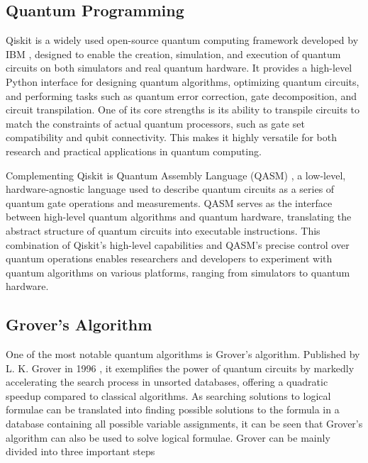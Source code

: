\subsection{Quantum Programming}
Qiskit is a widely used open-source quantum computing framework developed by IBM \cite{Qiskit}, designed to enable the creation, simulation, and execution of quantum circuits on both simulators and real quantum hardware. 
It provides a high-level Python interface for designing quantum algorithms, optimizing quantum circuits, and performing tasks such as quantum error correction, gate decomposition, and circuit transpilation. 
One of its core strengths is its ability to transpile circuits to match the constraints of actual quantum processors, such as gate set compatibility and qubit connectivity. 
This makes it highly versatile for both research and practical applications in quantum computing.

Complementing Qiskit is Quantum Assembly Language (QASM) \cite{cross2017openquantumassemblylanguage} \cite{OpenQASM3.0}, a low-level, hardware-agnostic language used to describe quantum circuits as a series of quantum gate operations and measurements.
QASM serves as the interface between high-level quantum algorithms and quantum hardware, translating the abstract structure of quantum circuits into executable instructions. 
This combination of Qiskit’s high-level capabilities and QASM’s precise control over quantum operations enables researchers and developers to experiment with quantum algorithms on various platforms, ranging from simulators to quantum hardware.

\subsection{Grover's Algorithm}
One of the most notable quantum algorithms is Grover's algorithm. 
Published by L. K. Grover in 1996 \cite{grover1996}, it exemplifies the power of quantum circuits by markedly accelerating the search process in unsorted databases, offering a quadratic speedup compared to classical algorithms. 
As searching solutions to logical formulae can be translated into finding possible solutions to the formula in a database containing all possible variable assignments, it can be seen that Grover's algorithm can also be used to solve logical formulae.
Grover can be mainly divided into three important steps

